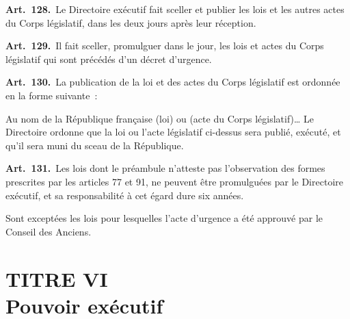 \documentclass[french,twoside]{book} %
\newcommand{\labelchar}[1]{\textbf{\color{rubric} #1}}
\begin{document}
\labelchar{Art. 128.} Le Directoire exécutif fait sceller et publier les lois et les autres actes du Corps législatif, dans les deux jours après leur réception.\par
\labelchar{Art. 129.} Il fait sceller, promulguer dans le jour, les lois et actes du Corps législatif qui sont précédés d’un décret d’urgence.\par
\labelchar{Art. 130.} La publication de la loi et des actes du Corps législatif est ordonnée en la forme suivante :\par
Au nom de la République française (loi) ou (acte du Corps législatif)… Le Directoire ordonne que la loi ou l’acte législatif ci-dessus sera publié, exécuté, et qu’il sera muni du sceau de la République.\par
\labelchar{Art. 131.} Les lois dont le préambule n’atteste pas l’observation des formes prescrites par les articles 77 et 91, ne peuvent être promulguées par le Directoire exécutif, et sa responsabilité à cet égard dure six années.\par
Sont exceptées les lois pour lesquelles l’acte d’urgence a été approuvé par le Conseil des Anciens.

\section[{TITRE VI. Pouvoir exécutif}]{TITRE VI \\
Pouvoir exécutif}
\end{document}
